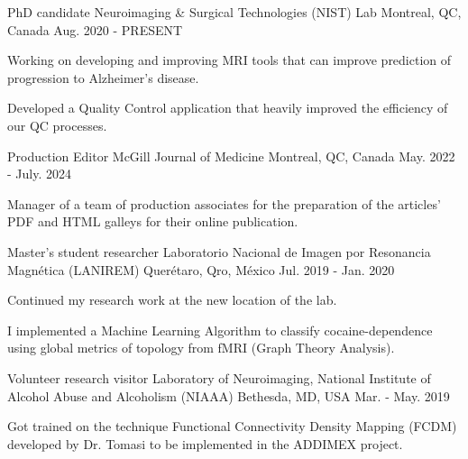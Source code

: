\vspace{-3.2mm}
\vspace{-1.5mm}
\begin{cventries}
    \cventry
        {PhD candidate}
        {Neuroimaging \& Surgical Technologies (NIST) Lab}
        {Montreal, QC, Canada}
        {Aug. 2020 - PRESENT}
        {
            \begin{cvitems}
                \item {Working on developing and improving MRI tools that can
                  improve prediction of progression to Alzheimer's disease.}
                \item {Developed a Quality Control application that heavily improved the efficiency of our QC processes.}
            \end{cvitems}
        }
    \cventry
        {Production Editor}
        {McGill Journal of Medicine}
        {Montreal, QC, Canada}
        {May. 2022 - July. 2024}
        {
            \begin{cvitems}
                \item {Manager of a team of production associates for the
                    preparation of the articles' PDF and HTML galleys for
                    their online publication.}
            \end{cvitems}
        }
    \cventry
        {Master's student researcher}
        {Laboratorio Nacional de Imagen por Resonancia Magnética (LANIREM)}
        {Querétaro, Qro, México}
        {Jul. 2019 - Jan. 2020}
        {
            \begin{cvitems}
                \item {Continued my research work at the new location of the lab.}
                \item {I implemented a Machine Learning Algorithm to classify
                  cocaine-dependence using global metrics of topology from fMRI
                  (Graph Theory Analysis).}
            \end{cvitems}
        }
    \cventry
        {Volunteer research visitor}
        {Laboratory of Neuroimaging, National Institute of Alcohol Abuse and
        Alcoholism (NIAAA)}
        {Bethesda, MD, USA}
        {Mar. - May. 2019}
        {
            \begin{cvitems}
                \item {Got trained on the technique Functional Connectivity
                  Density Mapping (FCDM) developed by Dr. Tomasi
                  to be implemented in the ADDIMEX project.}

\end{cvitems}}
\end{cventries}

